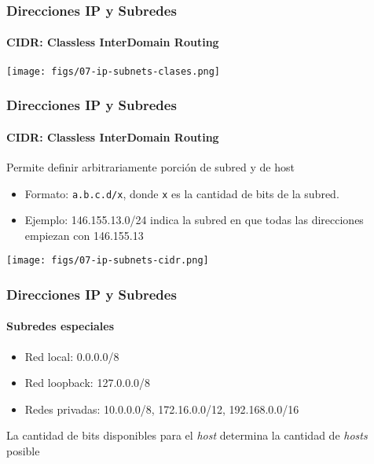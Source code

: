 \documentclass[letter]{beamer}
\begin{document}
\begin{frame}
  \frametitle{Direcciones IP y Subredes}
  \framesubtitle{CIDR: Classless InterDomain Routing}


  \begin{center}
    \texttt{[image: figs/07-ip-subnets-clases.png]}
  \end{center}

\end{frame}

\begin{frame}
  \frametitle{Direcciones IP y Subredes}
  \framesubtitle{CIDR: Classless InterDomain Routing}

  Permite definir arbitrariamente porción de subred y de host
  \begin{itemize}
    \item Formato: {\tt a.b.c.d/x}, donde {\tt x} es la cantidad de bits de la subred.
    \item Ejemplo: 146.155.13.0/24 indica la subred en que todas las direcciones empiezan con 146.155.13
  \end{itemize}

  \begin{center}
    \texttt{[image: figs/07-ip-subnets-cidr.png]}
  \end{center}
  
\end{frame}
\begin{frame}
  \frametitle{Direcciones IP y Subredes}
  \framesubtitle{Subredes especiales}

  \begin{itemize}
    \item Red local: 0.0.0.0/8
    \item Red loopback: 127.0.0.0/8
    \item Redes privadas: 10.0.0.0/8, 172.16.0.0/12, 192.168.0.0/16
  \end{itemize}

  La cantidad de bits disponibles para el {\em host} determina la cantidad de {\em hosts} posible
    
\end{frame}
\end{document}
